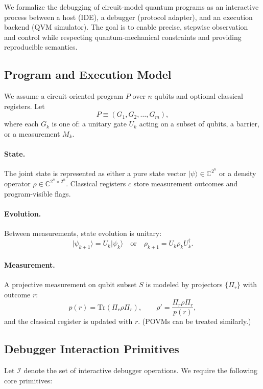 \documentclass[12pt]{article}
\begin{document}
We formalize the debugging of circuit-model quantum programs as an interactive process between a host (IDE), a debugger (protocol adapter), and an execution backend (QVM simulator). The goal is to enable precise, stepwise observation and control while respecting quantum-mechanical constraints and providing reproducible semantics.


\subsection{Program and Execution Model}

We assume a circuit-oriented program $P$ over $n$ qubits and optional classical registers. Let
\[
P \equiv (G_1, G_2, \ldots, G_m),
\]
where each $G_k$ is one of: a unitary gate $U_k$ acting on a subset of qubits, a barrier, or a measurement $M_k$.

\paragraph{State.}
The joint state is represented as either a pure state vector $\lvert \psi \rangle \in \mathbb{C}^{2^n}$ or a density operator $\rho \in \mathbb{C}^{2^n \times 2^n}$. Classical registers $c$ store measurement outcomes and program-visible flags.

\paragraph{Evolution.}
Between measurements, state evolution is unitary:
\[
\lvert \psi_{k+1} \rangle = U_k \lvert \psi_k \rangle
\quad \text{or} \quad
\rho_{k+1} = U_k \rho_k U_k^\dagger .
\]

\paragraph{Measurement.}
A projective measurement on qubit subset $S$ is modeled by projectors $\{ \Pi_r \}$ with outcome $r$:
\[
p(r) = \mathrm{Tr}(\Pi_r \rho \Pi_r), \qquad
\rho' = \frac{\Pi_r \rho \Pi_r}{p(r)} ,
\]
and the classical register is updated with $r$. (POVMs can be treated similarly.)

\subsection{Debugger Interaction Primitives}

Let $\mathcal{I}$ denote the set of interactive debugger operations. We require the following core primitives:
\end{document}
